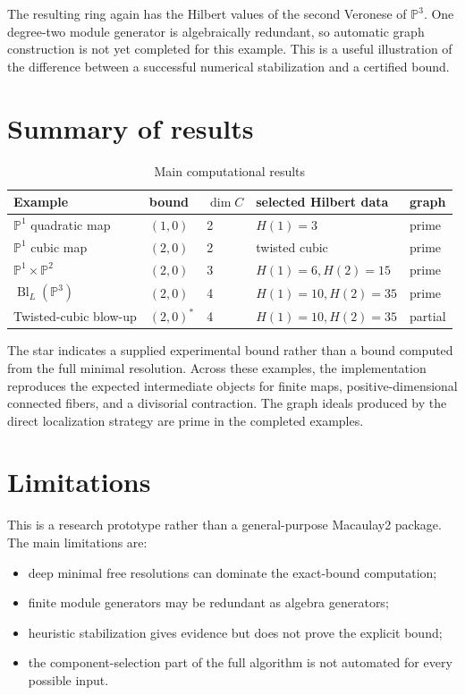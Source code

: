 \documentclass[a4paper,11pt]{article}
\begin{document}
The resulting ring again has the Hilbert values of the second Veronese of $\mathbb{P}^3$.
One degree-two module generator is algebraically redundant, so automatic graph
construction is not yet completed for this example. This is a useful illustration of the
difference between a successful numerical stabilization and a certified bound.

\section{Summary of results}

\begin{table}[ht]
\centering
\caption{Main computational results}
\begin{tabular}{lllll}
\toprule
Example & bound & $\dim C$ & selected Hilbert data & graph\\
\midrule
$\mathbb{P}^1$ quadratic map & $(1,0)$ & 2 & $H(1)=3$ & prime\\
$\mathbb{P}^1$ cubic map & $(2,0)$ & 2 & twisted cubic & prime\\
$\mathbb{P}^1\times\mathbb{P}^2$ & $(2,0)$ & 3 & $H(1)=6,H(2)=15$ & prime\\
$\operatorname{Bl}_L(\mathbb{P}^3)$ & $(2,0)$ & 4 & $H(1)=10,H(2)=35$ & prime\\
Twisted-cubic blow-up & $(2,0)^*$ & 4 & $H(1)=10,H(2)=35$ & partial\\
\bottomrule
\end{tabular}
\end{table}

The star indicates a supplied experimental bound rather than a bound computed from the
full minimal resolution. Across these examples, the implementation reproduces the
expected intermediate objects for finite maps, positive-dimensional connected fibers,
and a divisorial contraction. The graph ideals produced by the direct localization
strategy are prime in the completed examples.

\section{Limitations}

This is a research prototype rather than a general-purpose Macaulay2 package. The main
limitations are:

\begin{itemize}
  \item deep minimal free resolutions can dominate the exact-bound computation;
  \item finite module generators may be redundant as algebra generators;
  \item heuristic stabilization gives evidence but does not prove the explicit bound;
  \item the component-selection part of the full algorithm is not automated for every
        possible input.
\end{itemize}
\end{document}
